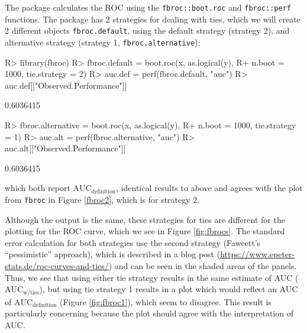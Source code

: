 \documentclass[article]{jss}
\begin{document}
The  package calculates the ROC using the
\texttt{fbroc::boot.roc} and \texttt{fbroc::perf} functions. The package
has 2 strategies for dealing with ties, which we will create 2 different
objects \texttt{fbroc.default}, using the default strategy (strategy 2),
and alternative strategy (strategy 1, \texttt{fbroc.alternative}):

\begin{CodeChunk}

\begin{CodeInput}
R> library(fbroc)
R> fbroc.default = boot.roc(x, as.logical(y), 
R+                          n.boot = 1000, tie.strategy = 2)
R> auc.def = perf(fbroc.default, "auc")
R> auc.def[["Observed.Performance"]]
\end{CodeInput}

\begin{CodeOutput}
[1] 0.6036415
\end{CodeOutput}

\begin{CodeInput}
R> fbroc.alternative = boot.roc(x, as.logical(y), 
R+                              n.boot = 1000, tie.strategy = 1)
R> auc.alt = perf(fbroc.alternative, "auc")
R> auc.alt[["Observed.Performance"]]
\end{CodeInput}

\begin{CodeOutput}
[1] 0.6036415
\end{CodeOutput}
\end{CodeChunk}

which both report \(\text{AUC}_{\text{definition}}\), identical results
to above and agrees with the plot from \texttt{fbroc} in Figure
\ref{fbroc2}, which is for strategy 2.

Although the output is the same, these strategies for ties are different
for the plotting for the ROC curve, which we see in Figure
\ref{fig:fbrocs}. The standard error calculation for both strategies use
the second strategy (Fawcett's ``pessimistic'' approach), which is
described in a blog post
(\url{https://www.epeter-stats.de/roc-curves-and-ties/}) and can be seen
in the shaded areas of the panels. Thus, we see that using either tie
strategy results in the same estimate of AUC
(\(\text{AUC}_{\text{w/ties}}\)), but using tie strategy 1 results in a
plot which would reflect an AUC of \(\text{AUC}_{\text{definition}}\)
(Figure \ref{fig:fbroc1}), which seem to disagree. This result is
particularly concerning because the plot should agree with the
interpretation of AUC.
\end{document}
